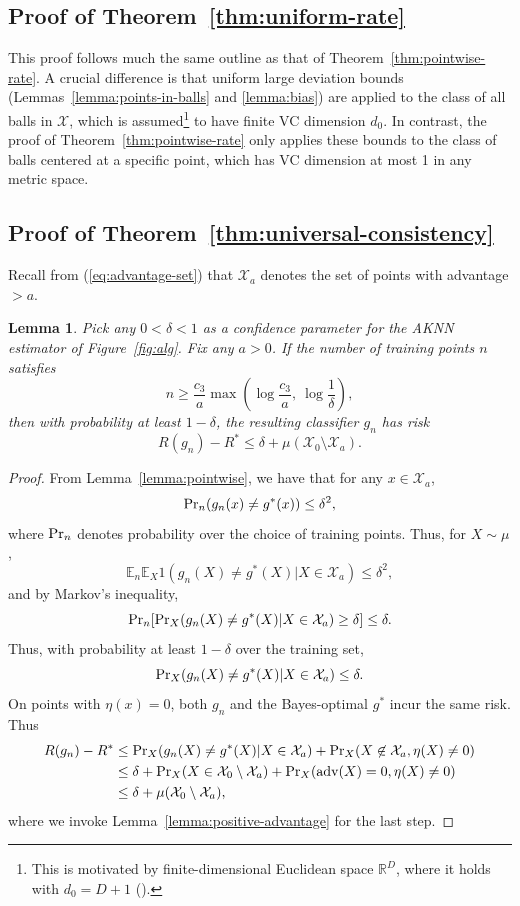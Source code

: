 \documentclass{article}
\def\pr{{\rm Pr}}
\def\E{{\mathbb E}}
\def\X{{\mathcal X}}
\def\adv{{\rm adv}}
\newtheorem{lemma}[theorem]{Lemma}
\newcommand{\comment}[3]{{\color{#1} {\bf #2 :} #3}}
\newcommand{\sanjoy}[1]{\comment{orange}{Sanjoy}{#1}}
\begin{document}
\subsection{Proof of Theorem~\ref{thm:uniform-rate}}

This proof follows much the same outline as that of Theorem~\ref{thm:pointwise-rate}. A crucial difference is that uniform large deviation bounds (Lemmas~\ref{lemma:points-in-balls} and \ref{lemma:bias}) are applied to the class of all balls in $\X$, which is assumed\footnote{This is motivated by finite-dimensional Euclidean space $\mathbb{R}^{D}$, where it holds with $d_0 = D+1$ (\cite{dudley79}).} to have finite VC dimension $d_0$. In contrast, the proof of Theorem~\ref{thm:pointwise-rate} only applies these bounds to the class of balls centered at a specific point, which has VC dimension at most 1 in any metric space.




\subsection{Proof of Theorem~\ref{thm:universal-consistency}}

Recall from (\ref{eq:advantage-set}) that $\X_a$ denotes the set of points with advantage $> a$.
\begin{lemma}
Pick any $0 < \delta < 1$ as a confidence parameter for the AKNN estimator of Figure~\ref{fig:alg}. Fix any $a > 0$. If the number of training points $n$ satisfies
$$ n \geq \frac{c_3}{a} \max\left(\log \frac{c_3}{a}, \ \log \frac{1}{\delta} \right), $$
then with probability at least $1-\delta$, the resulting classifier $g_n$ has risk
$$ R(g_n) - R^* \leq \delta + \mu(\X_0 \setminus \X_a) .$$
\label{lemma:advantage-set-convergence}
\end{lemma}
\begin{proof}
From Lemma~\ref{lemma:pointwise}, we have that for any $x \in \X_a$, 
$$ \pr_n(g_n(x) \neq g^*(x)) \leq \delta^2 ,$$
where $\pr_n$ denotes probability over the choice of training points. Thus, for $X \sim \mu$,
$$ \E_n \E_X 1(g_n(X) \neq g^*(X) | X \in \X_a) \leq \delta^2 ,$$
and by Markov's inequality,
$$ \pr_n [\pr_X (g_n(X) \neq g^*(X) |  X \in \X_a) \geq \delta] \leq \delta.$$
Thus, with probability at least $1-\delta$ over the training set,
$$\pr_X (g_n(X) \neq g^*(X) |  X \in \X_a) \leq \delta .$$
On points with $\eta(x) = 0$, both $g_n$ and the Bayes-optimal $g^*$ incur the same risk. Thus
\begin{align*}
R(g_n) - R^*
&\leq \pr_X(g_n(X) \neq g^*(X) | X \in \X_a) + \pr_X(X \not\in \X_a, \eta(X) \neq 0) \\ 
&\leq \delta + \pr_X(X \in \X_0 \setminus \X_a) + \pr_X(\adv(X) = 0, \eta(X) \neq 0) \\ 
&\leq \delta + \mu(\X_0 \setminus \X_a),
\end{align*}
where we invoke Lemma~\ref{lemma:positive-advantage} for the last step.
\end{proof}
\end{document}
